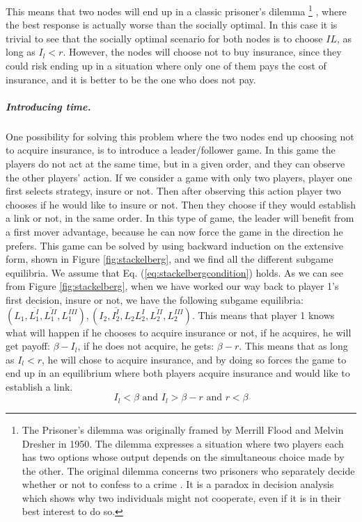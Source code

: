 This means that two nodes will end up in a classic prisoner's dilemma
\footnote{The Prisoner's dilemma was originally framed by Merrill Flood and Melvin Dresher in 1950. The dilemma expresses a situation where two players each has two options whose output depends on the simultaneous choice made by the other. The original dilemma concerns two prisoners who separately decide whether or not to confess to a crime \cite{oxfordPrisonersDilemma}.
It is a paradox in decision analysis which shows why two individuals might not cooperate, even if it is in their best interest to do so.}
, where the best response is actually worse than the socially optimal. In this case it is trivial to see that the socially optimal scenario for both nodes is to choose $IL$, as long as $I_{l}<r$. However, the nodes will choose not to buy insurance, since they could risk ending up in a situation where only one of them pays the cost of insurance, and it is better to be the one who does not pay. 

  
\subparagraph{Introducing time.}
\label{sec:introducing-time}
One possibility for solving this problem where the two nodes end up choosing not to acquire insurance, is to introduce a leader/follower game. 
In this game the players do not act at the same time, but in a given order, and they can observe the other players' action.
If we consider a game with only two players, player one first selects strategy, insure or not. Then after observing this action player two chooses if he would like to insure or not. Then they choose if they would establish a link or not, in the same order.
In this type of game, the leader will benefit from a first mover advantage, because he can now force the game in the direction he prefers.
This game can be solved by using backward induction on the extensive form, shown in Figure \ref{fig:stackelberg}, and we find all the different subgame equilibria. We assume that Eq. (\ref{eq:stackelbergcondition}) holds. As we can see from Figure \ref{fig:stackelberg}, when we have worked our way back to player 1's first decision, insure or not, we have the following subgame equilibria:$(L_{1},\overline{L^{I}_{1}},\overline{L^{II}_{1}},L^{III}_{1}), (I_{2},\overline{I^{I}_{2}},L_{2}L^{I}_{2},\overline{L^{II}_{2}},L^{III}_{2})$.
This means that player 1 knows what will happen if he chooses to acquire insurance or not, if he acquires, he will get payoff: $\beta-I_{l}$, if he does not acquire, he gets: $\beta-r$. This means that as long as $I_{l}<r$, he will chose to acquire insurance, and by doing so forces the game to end up in an equilibrium where both players acquire insurance and would like to establish a link.
\begin{equation}
I_{l}<\beta \text{ and } I_{l}>\beta-r \text{ and } r<\beta
\label{eq:stackelbergcondition}
\end{equation}

